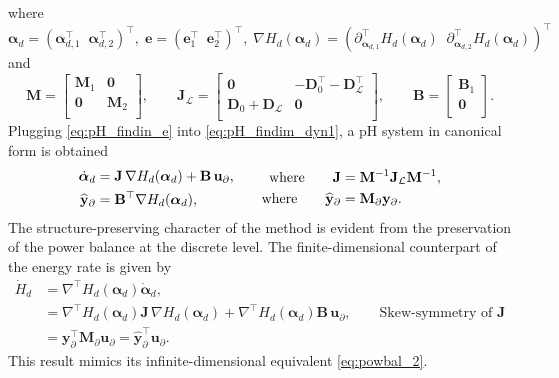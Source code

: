 where $\bm{\alpha}_{d}= (\bm{\alpha}_{d, 1}^\top \;\; \bm{\alpha}_{d, 2}^\top)^\top, \; \mathbf{e}= (\mathbf{e}_1^\top \;\; \mathbf{e}_2^\top)^\top, \; \nabla H_d(\bm{\alpha}_d) = (\partial_{\bm{\alpha}_{d, 1}}^\top H_d(\bm{\alpha}_d) \;\; \partial_{\bm{\alpha}_{d, 2}}^\top H_d(\bm{\alpha}_d))^\top$ and 
\begin{equation}
\mathbf{M} = \begin{bmatrix}
\mathbf{M}_1 & \mathbf{0} \\
\mathbf{0} & \mathbf{M}_2 \\
\end{bmatrix}, \qquad 
\mathbf{J}_\mathcal{L}= \begin{bmatrix}
\mathbf{0} & -\mathbf{D}_{0}^\top - \mathbf{D}_{\mathcal{L}}^\top \\
\mathbf{D}_{0} + \mathbf{D}_{\mathcal{L}} & \mathbf{0} \\
\end{bmatrix}, \qquad
\mathbf{B} =
\begin{bmatrix}
\mathbf{B}_1\\
\mathbf{0}\\
\end{bmatrix}.
\end{equation}
Plugging \eqref{eq:pH_findin_e} into \eqref{eq:pH_findim_dyn1}, a pH system in canonical form is obtained
\begin{equation}
	\begin{aligned}
	\dot{\bm{\alpha}}_{d} &= \mathbf{J}\, \nabla H_d(\bm{\alpha}_d) + \mathbf{B}\, \mathbf{u}_\partial,\\
	\widehat{\mathbf{y}}_\partial &= \mathbf{B}^\top \nabla H_d(\bm{\alpha}_d), 
	\end{aligned}
	\begin{aligned}
	\qquad \text{where} \qquad \mathbf{J} &= \mathbf{M}^{-1} \mathbf{J}_\mathcal{L} \mathbf{M}^{-1},\\
	\qquad \text{where} \qquad \widehat{\mathbf{y}}_\partial &= \mathbf{M}_\partial \mathbf{y}_\partial.
	\end{aligned}
\end{equation}
The structure-preserving character of the method is evident from the preservation of the power balance at the discrete level. The finite-dimensional counterpart of the energy rate is given by
\begin{equation}
\begin{aligned}
\dot{H}_d &= \nabla^\top H_d(\bm{\alpha}_d) \dot{\bm{\alpha}}_d, \\
&= \nabla^\top H_d(\bm{\alpha}_d) \mathbf{J}\, \nabla H_d(\bm{\alpha}_d) + \nabla^\top H_d(\bm{\alpha}_d) \mathbf{B}\, \mathbf{u}_\partial, \qquad \text{Skew-symmetry of }\mathbf{J} \\
&= {\mathbf{y}}_\partial^\top \mathbf{M}_\partial \mathbf{u}_\partial = \widehat{\mathbf{y}}_\partial^\top \mathbf{u}_\partial.
\end{aligned}
\end{equation}
This result mimics its infinite-dimensional equivalent \eqref{eq:powbal_2}.

